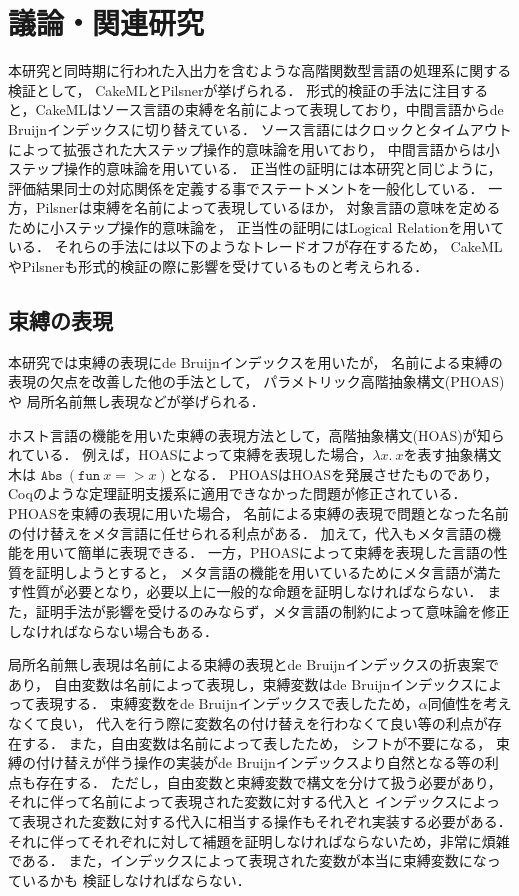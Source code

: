 \documentclass[T]{compsoft}
\begin{document}
\section{議論・関連研究}
本研究と同時期に行われた入出力を含むような高階関数型言語の処理系に関する検証として，
CakeML\cite{DBLP:conf/popl/KumarMNO14}とPilsner\cite{DBLP:conf/icfp/NeisHKMDV15}が挙げられる．
形式的検証の手法に注目すると，CakeMLはソース言語の束縛を名前によって表現しており，中間言語からde Bruijnインデックスに切り替えている．
ソース言語にはクロックとタイムアウトによって拡張された大ステップ操作的意味論を用いており，
中間言語からは小ステップ操作的意味論を用いている．
正当性の証明には本研究と同じように，評価結果同士の対応関係を定義する事でステートメントを一般化している．
一方，Pilsnerは束縛を名前によって表現しているほか，
対象言語の意味を定めるために小ステップ操作的意味論を，
正当性の証明にはLogical Relationを用いている．
それらの手法には以下のようなトレードオフが存在するため，
CakeMLやPilsnerも形式的検証の際に影響を受けているものと考えられる．

\subsection{束縛の表現}
本研究では束縛の表現にde Bruijnインデックスを用いたが，
名前による束縛の表現の欠点を改善した他の手法として，
パラメトリック高階抽象構文(PHOAS)\cite{Chlipala:2008:PHA:1411204.1411226}や
局所名前無し表現\cite{chargueraud-11-ln}などが挙げられる．

ホスト言語の機能を用いた束縛の表現方法として，高階抽象構文(HOAS)が知られている．
例えば，HOASによって束縛を表現した場合，$\lambda x.~x$を表す抽象構文木は
$\texttt{Abs}~(\texttt{fun}~x => x)$となる．
PHOASはHOASを発展させたものであり，
Coqのような定理証明支援系に適用できなかった問題が修正されている．
PHOASを束縛の表現に用いた場合，
名前による束縛の表現で問題となった名前の付け替えをメタ言語に任せられる利点がある．
加えて，代入もメタ言語の機能を用いて簡単に表現できる．
一方，PHOASによって束縛を表現した言語の性質を証明しようとすると，
メタ言語の機能を用いているためにメタ言語が満たす性質が必要となり，必要以上に一般的な命題を証明しなければならない．
また，証明手法が影響を受けるのみならず，メタ言語の制約によって意味論を修正しなければならない場合もある．

局所名前無し表現は名前による束縛の表現とde Bruijnインデックスの折衷案であり，
自由変数は名前によって表現し，束縛変数はde Bruijnインデックスによって表現する．
束縛変数をde Bruijnインデックスで表したため，$\alpha$同値性を考えなくて良い，
代入を行う際に変数名の付け替えを行わなくて良い等の利点が存在する．
また，自由変数は名前によって表したため，
シフトが不要になる，
束縛の付け替えが伴う操作の実装がde Bruijnインデックスより自然となる等の利点も存在する．
ただし，自由変数と束縛変数で構文を分けて扱う必要があり，
それに伴って名前によって表現された変数に対する代入と
インデックスによって表現された変数に対する代入に相当する操作もそれぞれ実装する必要がある．
それに伴ってそれぞれに対して補題を証明しなければならないため，非常に煩雑である．
また，インデックスによって表現された変数が本当に束縛変数になっているかも
検証しなければならない．
\end{document}
